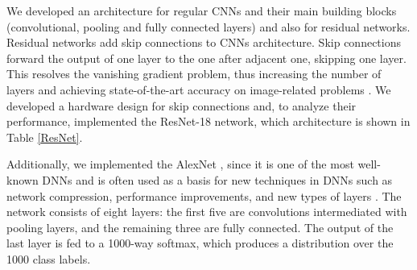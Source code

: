 \documentclass[conference]{IEEEtran}
\begin{document}
	We developed an architecture for regular CNNs and their main building blocks (convolutional, pooling and fully connected layers) and also for residual networks.
	Residual networks add skip connections to CNNs architecture. Skip connections forward the output of one layer to the one after adjacent one, skipping one layer. This resolves the vanishing gradient \cite{bengio1994learning} problem, thus increasing the number of layers and achieving state-of-the-art accuracy on image-related problems \cite{DBLP:journals/corr/ZagoruykoK16} \cite{inceptionv4} \cite{DBLP:journals/corr/HuangRSZKFFWSG016}.  
	We developed a hardware design for skip connections and, to analyze their performance, implemented the ResNet-18 \cite{he2016deep} network, which architecture is shown in Table \ref{ResNet}.
	
	Additionally, we implemented the AlexNet \cite{NIPS2012_4824}, since it is one of the most well-known DNNs and is often used as a basis for new techniques in DNNs such as network compression, performance improvements, and new types of layers \cite{DBLP:journals/corr/HanMD15} \cite{dicecco2016caffeinated} \cite{rastegari2016xnor} \cite{DBLP:journals/corr/IandolaMAHDK16} \cite{DBLP:journals/corr/MiyashitaLM16} \cite{DBLP:journals/corr/HubaraCSEB16} \cite{DBLP:journals/corr/AydonatOCLC17}.
	The network consists of eight layers: the first five are convolutions intermediated with pooling layers, and the remaining three are fully connected.
	The output of the last layer is fed to a 1000-way softmax, which produces a distribution over the 1000 class labels.
	\newcommand{\blocka}[2]{\multirow{3}{*}{\(\left[\begin{array}{c}\text{3$\times$3, #1}\\[-.1em] \text{3$\times$3, #1} \end{array}\right]\)$\times$#2}
	}
	\newcommand{\blockb}[3]{\multirow{3}{*}{\(\left[\begin{array}{c}\text{1$\times$1, #2}\\[-.1em] \text{3$\times$3, #2}\\[-.1em] \text{1$\times$1, #1}\end{array}\right]\)$\times$#3}
	}
	\renewcommand\arraystretch{1.1}
	\setlength{\tabcolsep}{3pt}
\end{document}

